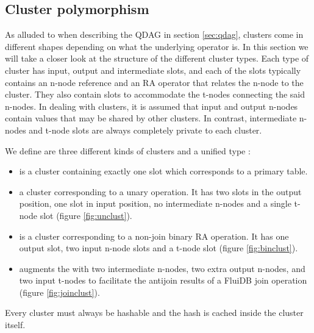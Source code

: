\subsection{Cluster polymorphism}
\label{sec:cluster_polymorphism}

As alluded to when describing the QDAG in section \ref{sec:qdag},
clusters come in different shapes depending on what the underlying
operator is. In this section we will take a closer look at the
structure of the different cluster types. Each type of cluster has
input, output and intermediate slots, and each of the slots typically
contains an n-node reference and an RA operator that relates the n-node
to the cluster. They also contain slots to accommodate the t-nodes
connecting the said n-nodes. In dealing with clusters, it is assumed that
input and output n-nodes contain values that may be shared by other
clusters. In contrast, intermediate n-nodes and t-node slots are
always completely private to each cluster.

We define are three different kinds of clusters and a unified type
:

\begin{itemize}
\item {} is a cluster containing exactly one slot which
  corresponds to a primary table.
\item {} a cluster corresponding to a unary operation. It
  has two slots in the output position, one slot in input position, no
  intermediate n-nodes and a single t-node slot (figure
  \ref{fig:unclust}).
\item {} is a cluster corresponding to a non-join binary
  RA operation. It has one output slot, two input n-node slots and a
  t-node slot (figure \ref{fig:binclust}).
\item {} augments the  with two
  intermediate n-nodes, two extra output n-nodes, and two input
  t-nodes to facilitate the antijoin results of a FluiDB join
  operation (figure \ref{fig:joinclust}).
\end{itemize}

Every cluster must always be hashable and the hash is cached inside
the cluster itself.


